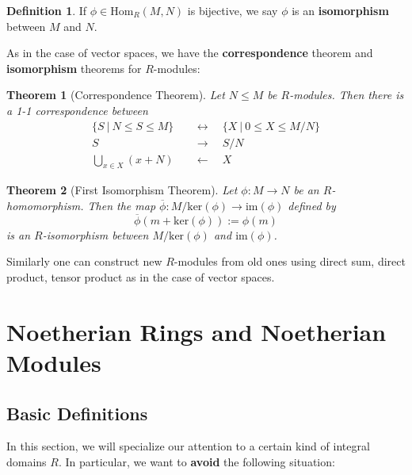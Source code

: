 \documentclass[11pt,openany]{book}
\theoremstyle{plain}
\newtheorem{theorem}{Theorem}[chapter]
\theoremstyle{definition}
\newtheorem{definition}[definition]{Definition}
\theoremstyle{remark}
\begin{document}
\begin{definition}
    If $\phi\in\mathrm{Hom}_{R}(M,N)$ is bijective, we say $\phi$ is an {\bf isomorphism} between $M$ and $N$.
\end{definition}

As in the case of vector spaces, we have the {\bf correspondence} theorem and {\bf isomorphism} theorems for $R$-modules:

\begin{theorem} [Correspondence Theorem]
    Let $N\leq M$ be $R$-modules. Then there is a 1-1 correspondence between
    \begin{align*}
        \{S\ |\ N\leq S\leq M\}\quad&\leftrightarrow\quad\{X\ |\ 0\leq X\leq M/N\}\\
        S\quad&\rightarrow\quad S/N\\
        \bigcup_{x\in X}(x+N)\quad&\leftarrow\quad X
    \end{align*}
\end{theorem}

\begin{theorem} [First Isomorphism Theorem]
    Let $\phi:M\to N$ be an $R$-homomorphism. Then the map $\overline{\phi}:M/\mathrm{ker}(\phi)\to \mathrm{im}(\phi)$ defined by
    $$\overline{\phi}(m+\mathrm{ker}(\phi)):=\phi(m)$$
    is an $R$-isomorphism between $M/\mathrm{ker}(\phi)$ and $\mathrm{im}(\phi)$.
\end{theorem}

Similarly one can construct new $R$-modules from old ones using direct sum, direct product, tensor product as in the case of vector spaces.



\chapter{Noetherian Rings and Noetherian Modules}
\section{Basic Definitions}
In this section, we will specialize our attention to a certain kind of integral domains $R$. In particular, we want to {\bf avoid} the following situation:
\end{document}
